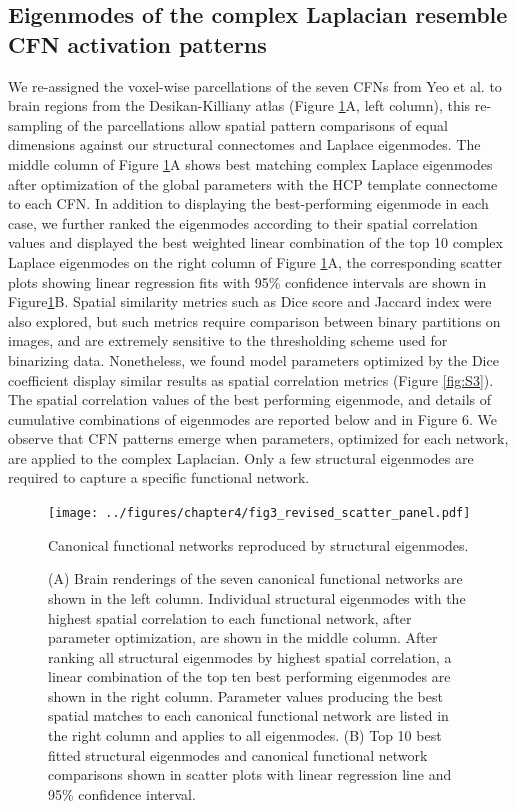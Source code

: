 \subsection{Eigenmodes of the complex Laplacian resemble CFN activation patterns}
We re-assigned the voxel-wise parcellations of the seven CFNs from Yeo et al. \cite{Yeo2011} to brain regions from the Desikan-Killiany atlas (Figure \ref{fig:fig3}A, left column), this re-sampling of the parcellations allow spatial pattern comparisons of equal dimensions against our structural connectomes and Laplace eigenmodes. The middle column of Figure \ref{fig:fig3}A shows best matching complex Laplace eigenmodes after optimization of the global parameters with the HCP template connectome to each CFN. In addition to displaying the best-performing eigenmode in each case, we further ranked the eigenmodes according to their spatial correlation values and displayed the best weighted linear combination of the top 10 complex Laplace eigenmodes on the right column of Figure \ref{fig:fig3}A, the corresponding scatter plots showing linear regression fits with 95\% confidence intervals are shown in Figure\ref{fig:fig3}B.  Spatial similarity metrics such as Dice score and Jaccard index were also explored, but such metrics require comparison between binary partitions on images, and are extremely sensitive to the thresholding scheme used for binarizing data. Nonetheless, we found model parameters optimized by the Dice coefficient display similar results as spatial correlation metrics (Figure \ref{fig:S3}). The spatial correlation values of the best performing eigenmode, and details of cumulative combinations of eigenmodes are reported below and in Figure 6. We observe that CFN patterns emerge when parameters, optimized for each network, are applied to the complex Laplacian. Only a few structural eigenmodes are required to capture a specific functional network. 

\begin{figure}[htp]
 \centering
 \texttt{[image: ../figures/chapter4/fig3\_revised\_scatter\_panel.pdf]}
 \caption{Canonical functional networks reproduced by structural eigenmodes.}
 \caption*{(A) Brain renderings of the seven canonical functional networks are shown in the left column. Individual structural eigenmodes with the highest spatial correlation to each functional network, after parameter optimization, are shown in the middle column. After ranking all structural eigenmodes by highest spatial correlation, a linear combination of the top ten best performing eigenmodes are shown in the right column. Parameter values producing the best spatial matches to each canonical functional network are listed in the right column and applies to all eigenmodes. (B) Top 10 best fitted structural eigenmodes and canonical functional network comparisons shown in scatter plots with linear regression line and 95\% confidence interval.}
 \label{fig:fig3}
\end{figure}

